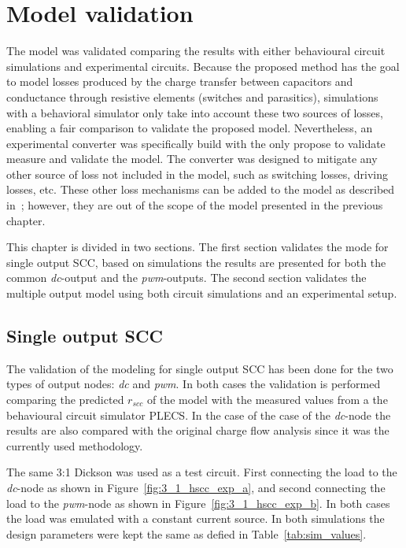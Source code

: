 \chapter{Model validation}
The model was validated comparing the results with either behavioural circuit simulations and experimental circuits.  Because the proposed method has the goal to model losses produced by the charge transfer between capacitors and conductance through resistive elements (switches and parasitics), simulations with a behavioral simulator only take into account these two sources of losses, enabling a fair comparison to validate the proposed model.  Nevertheless, an experimental converter was specifically build with the only propose to validate measure and validate the model. The converter was designed to mitigate any other source of loss not included in the model, such as switching losses, driving losses, etc. These other loss mechanisms can be added to the model as described in~\cite{Seeman:EECS-2009-78}; however, they are out of the scope of the model presented in the previous chapter.

This chapter is divided in two sections. The first section validates the mode for single output SCC, based on simulations the results are presented for both the common \emph{dc}-output and the \emph{pwm}-outputs.  The second section validates the multiple output model using both circuit simulations and an experimental setup.

\section{Single output SCC}
The validation of the modeling for single output SCC has been done for the two types of output nodes: \emph{dc} and \emph{pwm}. In both cases the validation is performed comparing the predicted $r_{scc}$ of the model with the measured values from a the behavioural circuit simulator PLECS. In the case of the case of the \emph{dc}-node the results are also compared with the original charge flow analysis since it was the currently used methodology.

The same 3:1 Dickson was used as a test circuit. First connecting the load to the \emph{dc}-node as shown in Figure~\ref{fig:3_1_hscc_exp_a}, and second connecting the load to the \emph{pwm}-node as shown in Figure~\ref{fig:3_1_hscc_exp_b}. In both cases the load was emulated with a constant current source. In both simulations the design parameters were kept the same as defied in Table~\ref{tab:sim_values}.

